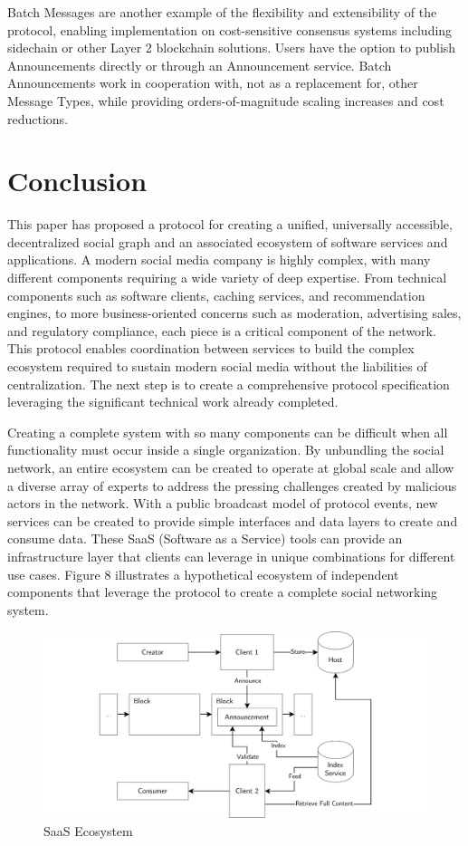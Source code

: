 \documentclass[12pt,letterpaper]{article}
\begin{document}
Batch Messages are another example of the flexibility and extensibility of the
protocol, enabling implementation on cost-sensitive consensus systems including
sidechain or other Layer 2 blockchain solutions.  Users have the option to publish
Announcements directly or through an Announcement service. Batch Announcements work
in cooperation with, not as a replacement for, other Message Types, while providing
orders-of-magnitude scaling increases and cost reductions.

\section{Conclusion}\label{sec:conclusion}

This paper has proposed a protocol for creating a unified, universally accessible,
decentralized social graph and an associated ecosystem of software services and
applications. A modern social media company is highly complex, with many different
components requiring a wide variety of deep expertise. From technical components such as
software clients, caching services, and recommendation engines,\cite{hashemi2017} to more
business-oriented concerns such as moderation, advertising sales, and regulatory compliance,
each piece is a critical component of the network. This protocol enables coordination
between services to build the complex ecosystem required to sustain modern social media
without the liabilities of centralization. The next step is to create a comprehensive
protocol specification leveraging the significant technical work already completed.

Creating a complete system with so many components can be difficult when all functionality
must occur inside a single organization. By unbundling the social network, an entire
ecosystem can be created to operate at global scale and allow a diverse
array of experts to address the pressing challenges created by malicious actors in the
network. With a public broadcast model of protocol events, new services can be created to
provide simple interfaces and data layers to create and consume data. These SaaS (Software
as a Service) tools can provide an infrastructure layer that clients can leverage in unique
combinations for different use cases. Figure 8 illustrates a hypothetical ecosystem of
independent components that leverage the protocol to create a complete social networking
system.

\begin{figure}
	\includegraphics[width=\linewidth]{figures/SaaS Ecosystem.png}
	\caption{SaaS Ecosystem}
	\label{fig:8}
\end{figure}
\end{document}
